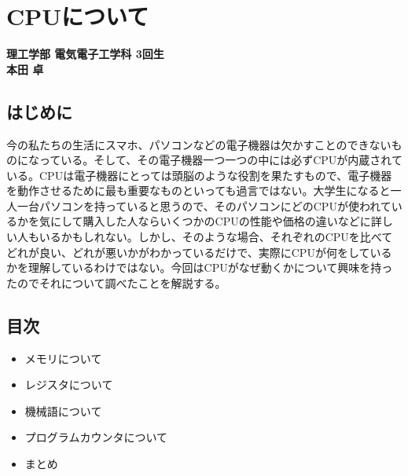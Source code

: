 \chapter{CPUについて}
\vspace{-45pt} %
\begin{flushright}
  {\bf \large 理工学部 電気電子工学科 3回生} \\ \vspace{3pt} %
  {\bf \large 本田 卓} \\ \vspace{30pt} %
\end{flushright}

\section*{はじめに}
今の私たちの生活にスマホ、パソコンなどの電子機器は欠かすことのできないものになっている。そして、その電子機器一つ一つの中には必ずCPUが内蔵されている。CPUは電子機器にとっては頭脳のような役割を果たすもので、電子機器を動作させるために最も重要なものといっても過言ではない。大学生になると一人一台パソコンを持っていると思うので、そのパソコンにどのCPUが使われているかを気にして購入した人ならいくつかのCPUの性能や価格の違いなどに詳しい人もいるかもしれない。しかし、そのような場合、それぞれのCPUを比べてどれが良い、どれが悪いかがわかっているだけで、実際にCPUが何をしているかを理解しているわけではない。今回はCPUがなぜ動くかについて興味を持ったのでそれについて調べたことを解説する。
\section*{目次}
\begin{itemize}
  \item メモリについて
  \item レジスタについて
  \item 機械語について
  \item プログラムカウンタについて
  \item まとめ
\end{itemize}

